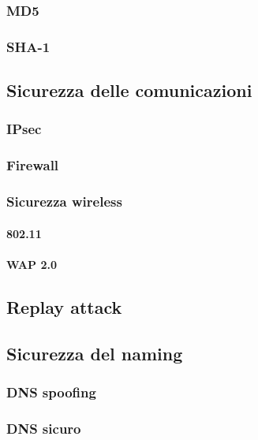 \subsubsection{MD5}

\subsubsection{SHA-1}

\subsection{Sicurezza delle comunicazioni} %

\subsubsection{IPsec} %

\subsubsection{Firewall} %

\subsubsection{Sicurezza wireless} %

\paragraph{802.11}

\paragraph{WAP 2.0}

\subsection{Replay attack} %

\subsection{Sicurezza del naming} %

\subsubsection{DNS spoofing}

\subsubsection{DNS sicuro}

